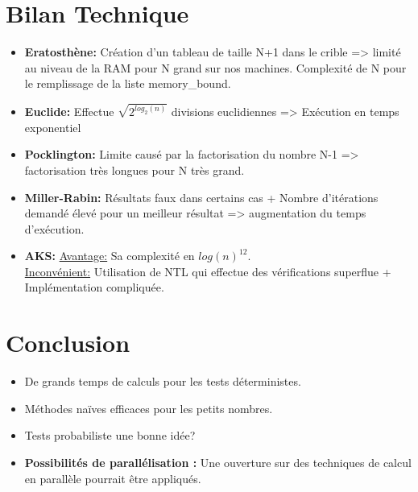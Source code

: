 	\section{Bilan Technique}
		\begin{frame}
			\begin{itemize}
			\item \textbf{Eratosthène:} Création d'un tableau de taille N+1 dans le crible => limité au niveau de la RAM pour N grand sur nos machines. Complexité de N pour le remplissage de la liste memory\_bound. \\
			\vspace{1em}			
			\item \textbf{Euclide:} Effectue $\sqrt{2^{log_2(n)}}$ divisions euclidiennes => Exécution en temps exponentiel\\
			\vspace{1em}
			\item \textbf{Pocklington:} Limite causé par la factorisation du nombre N-1 => factorisation très longues pour N très grand.\\
			\vspace{1em}
			\item \textbf{Miller-Rabin:} Résultats faux dans certains cas + Nombre d'itérations demandé élevé pour un meilleur résultat => augmentation du temps d'exécution.  \\
			\vspace{1em}
			\item \textbf{AKS:} \underline{Avantage:} Sa complexité en $log(n)^{12}$.\\
						\underline{Inconvénient:} Utilisation de NTL qui effectue des vérifications superflue + Implémentation compliquée.\\
			
			\end{itemize}	
			\end{frame}
		
		

	\section{Conclusion}
		\begin{frame}
	\begin{itemize}
        \item De grands temps de calculs pour les tests déterministes. \vspace{1em}
        \item Méthodes naïves efficaces pour les petits nombres. \vspace{1em}
        \item Tests probabiliste une bonne idée? \vspace{1em}
        \item \textbf{Possibilités de parallélisation :} Une ouverture sur des techniques de calcul en parallèle pourrait être appliqués.
     \end{itemize}
		\end{frame}	
		
